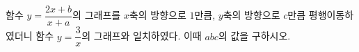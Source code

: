 함수 $y=\dfrac{2x+b}{x+a}$의 그래프를 $x$축의 방향으로 $1$만큼, $y$축의 방향으로 $c$만큼 평행이동하였더니 함수 $y=\dfrac{3}{x}$의 그래프와 일치하였다. 이때 $abc$의 값을 구하시오. 
